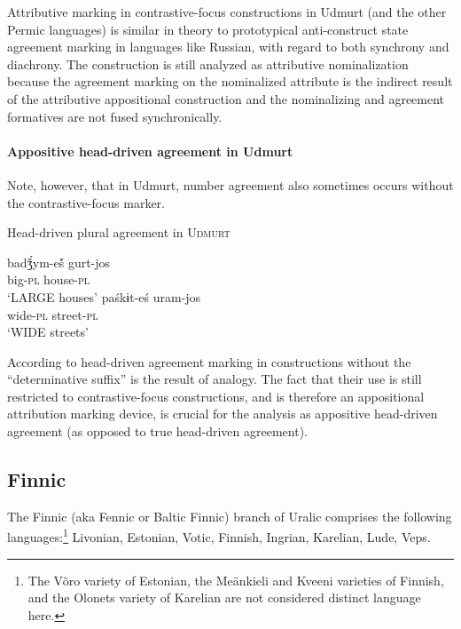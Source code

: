 Attributive marking in contrastive-focus constructions in Udmurt (and the other Permic languages) is similar in theory to prototypical anti-construct state agreement marking in languages like Russian, with regard to both synchrony and diachrony. The construction is still analyzed as attributive nominalization because the agreement marking on the nominalized attribute is the indirect result of the attributive appositional construction and the nominalizing and agreement formatives are not fused synchronically.

\paragraph{Appositive head-driven agreement in Udmurt}
Note, however, that in Udmurt, number agreement also sometimes occurs without the contrastive-focus marker.
\begin{exe}
\ex Head-driven plural agreement in \textsc{Udmurt}
\begin{xlist}
\ex 
\gll	badǯ́ym-eš́ gurt-jos\\
	big-\textsc{pl} house-\textsc{pl}\\
\glt	‘LARGE houses’ \citep[40]{winkler2001}
\ex 
\gll	paśkɨt-eś uram-jos\\
	wide-\textsc{pl} street-\textsc{pl}\\
\glt	‘WIDE streets’  \citep[63]{csucs1990}
\end{xlist}
\end{exe}
According to \citet[63]{csucs1990} head-driven agreement marking in constructions without the “determinative suffix” is the result of analogy. The fact that their use is still restricted to contrastive-focus constructions, and is therefore an appositional attribution marking device, is crucial for the analysis as appositive head-driven agreement (as opposed to true head-driven agreement).

\subsection{Finnic}
The Finnic (aka Fennic or Baltic Finnic) branch of Uralic comprises the following languages:\footnote{The Võro variety of Estonian, the Meänkieli and Kveeni varieties of Finnish, and the Olonets variety of Karelian are not considered distinct language here.} Livonian, Estonian, Votic, Finnish, Ingrian, Karelian, Lude, Veps.\\

